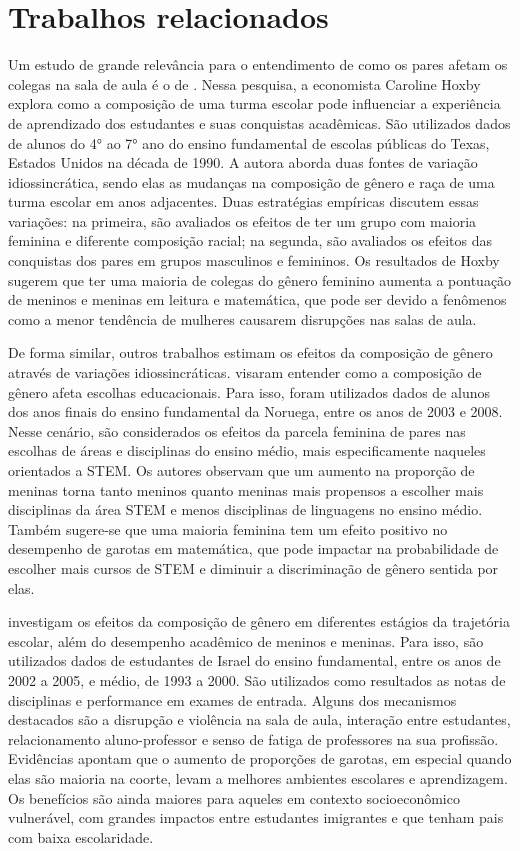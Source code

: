 \chapter{Trabalhos relacionados}

Um estudo de grande relevância para o entendimento de como os pares afetam os colegas na sala de aula é o de \citet{Hoxby-2000}. Nessa pesquisa, a economista Caroline Hoxby explora como a composição de uma turma escolar pode influenciar a experiência de aprendizado dos estudantes e suas conquistas acadêmicas. São utilizados dados de alunos do 4° ao 7° ano do ensino fundamental de escolas públicas do Texas, Estados Unidos na década de 1990. A autora aborda duas fontes de variação idiossincrática, sendo elas as mudanças na composição de gênero e raça de uma turma escolar em anos adjacentes. Duas estratégias empíricas discutem essas variações: na primeira, são avaliados os efeitos de ter um grupo com maioria feminina e diferente composição racial; na segunda, são avaliados os efeitos das conquistas dos pares em grupos masculinos e femininos. Os resultados de Hoxby sugerem que ter uma maioria de colegas do gênero feminino aumenta a pontuação de meninos e meninas em leitura e matemática, que pode ser devido a fenômenos como a menor tendência de mulheres causarem disrupções nas salas de aula.

De forma similar, outros trabalhos estimam os efeitos da composição de gênero através de variações idiossincráticas. \citet{Schne2019} visaram entender como a composição de gênero afeta escolhas educacionais. Para isso, foram utilizados dados de alunos dos anos finais do ensino fundamental da Noruega, entre os anos de 2003 e 2008. Nesse cenário, são considerados os efeitos da parcela feminina de pares nas escolhas de áreas e disciplinas do ensino médio, mais especificamente naqueles orientados a STEM. Os autores observam que um aumento na proporção de meninas torna tanto meninos quanto meninas mais propensos a escolher mais disciplinas da área STEM e menos disciplinas de linguagens no ensino médio. Também sugere-se que uma maioria feminina tem um efeito positivo no desempenho de garotas em matemática, que pode impactar na probabilidade de escolher mais cursos de STEM e diminuir a discriminação de gênero sentida por elas. 

\citet{Lavy2011} investigam os efeitos da composição de gênero em diferentes estágios da trajetória escolar, além do desempenho acadêmico de meninos e meninas. Para isso, são utilizados dados de estudantes de Israel do ensino fundamental, entre os anos de 2002 a 2005, e médio, de 1993 a 2000. São utilizados como resultados as notas de disciplinas e performance em exames de entrada. Alguns dos mecanismos destacados são a disrupção e violência na sala de aula, interação entre estudantes, relacionamento aluno-professor e senso de fatiga de professores na sua profissão. Evidências apontam que o aumento de proporções de garotas, em especial quando elas são maioria na coorte, levam a melhores ambientes escolares e aprendizagem. Os benefícios são ainda maiores para aqueles em contexto socioeconômico vulnerável, com grandes impactos entre estudantes imigrantes e que tenham pais com baixa escolaridade.

